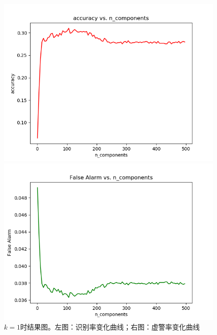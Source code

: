 \documentclass[cn]{elegantbook}
\begin{document}
\begin{figure}[!h]
	\centering
	\begin{minipage}[t]{0.48\textwidth}
		\centering
		\includegraphics[width=\textwidth]{../results/acc_n_1_open}
	\end{minipage}
	\begin{minipage}[t]{0.48\textwidth}
		\centering
		\includegraphics[width=\textwidth]{../results/falseAlarm_n_1_open}
	\end{minipage}
	\caption{\label{knn_res_1_open}$k=1$时结果图。左图：识别率变化曲线；右图：虚警率变化曲线}
\end{figure}
\end{document}
